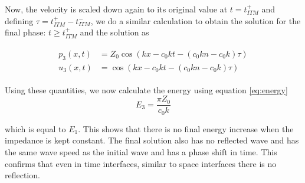 Now, the velocity is scaled down again to its original value at $t=t_{ITM}^+$ and defining $\tau = t_{ITM}^+ - t_{ITM}^-$, we do a similar calculation to obtain the solution for the final phase: $t \geq t_{ITM}^+$ and the solution as

\begin{align}
    \begin{split}
        p_3\left(x, t\right) & = Z_{0} \cos\left(kx - c_{0} k t - {\left(c_{0} k n - c_{0} k\right)} \tau\right)\\
        u_3\left(x, t\right) & =  \cos\left(kx - c_{0} k t - {\left(c_{0} k n - c_{0} k\right)} \tau\right)
    \end{split}
\end{align}

Using these quantities, we now calculate the energy using equation \ref{eq:energy}
\begin{equation}
    E_3 = \frac{\pi Z_0}{c_0 k}
\end{equation}

which is equal to $E_1$. This shows that there is no final energy increase when the impedance is kept constant. The final solution also has no reflected wave and has the same wave speed as the initial wave and has a phase shift in time. This confirms that even in time interfaces, similar to space interfaces there is no reflection.


